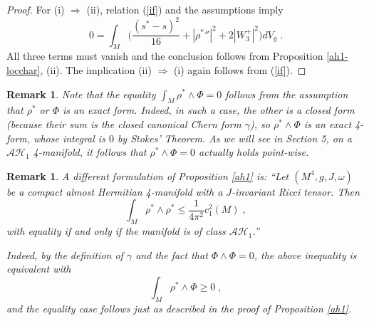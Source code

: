 \documentclass{amsart}
\newtheorem{remark}[theorem]{Remark}
\begin{document}
\begin{proof}
For (i) $ \Rightarrow $ (ii), relation (\ref{if}) and the assumptions imply 
$$ 0 = \int_M \Big(  \frac{(s^* - s)^2}{16} + |{\rho^*}''|^2 + 2 |W_3^+|^2 \Big) dV_g \; .$$
All three terms must vanish and the conclusion follows from Proposition \ref{ah1-locchar}, (ii).
The implication (ii) $ \Rightarrow $ (i) again follows from (\ref{if}).
%
%
\end{proof}

\begin{remark} \label{suff-conds}
Note that the equality $ \displaystyle{ \int_M \rho^* \wedge \Phi  = 0}$ follows from the assumption that $\rho^*$ or $\Phi$ is an exact form. Indeed, in such a case, the other is a closed form (because their sum is the closed canonical Chern form $\gamma$), so $\rho^* \wedge \Phi$ is an exact 4-form, whose integral is $0$ by Stokes' Theorem. As we will see in Section 5, on a $\mathcal{AH}_1$ 4-manifold, it follows that $\rho^* \wedge \Phi = 0$ actually holds point-wise.
\end{remark}

\begin{remark} \label{equiv-forms}
A different formulation of Proposition \ref{ah1} is: ``Let $(M^4, g, J, \omega)$ be a compact almost Hermitian 4-manifold with a $J$-invariant Ricci tensor. Then
$$\int_M \rho^* \wedge \rho^* \leq \frac{1}{4\pi^2} c_1^2(M) \; ,$$ 
with equality if and only if the manifold is of class $\mathcal{AH}_1$.''

\noindent
Indeed, by the definition of $\gamma$ and the fact that $\Phi \wedge \Phi = 0$, the above inequality is equivalent with 
$$ \int_M \rho^* \wedge \Phi  \geq 0 \; ,$$
and the equality case follows just as described in the proof of Proposition \ref{ah1}.
\end{remark}
\end{document}
